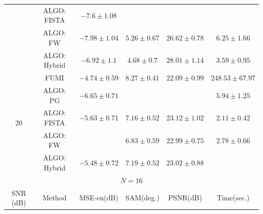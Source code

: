 \begin{table}[h]
{\begin{threeparttable}
\begin{tabular}{|c|c|c|c|c|c|}
                    & ALGO: FISTA            &                    {$-7.6\pm 1.08$}  & \cellcolor{red! 10}{$4.24\pm 0.79$} & \cellcolor{red! 10}{$28.84\pm 1.6$}  & \cellcolor{red! 10}{$3.02\pm 0.67$}     \tabularnewline
                    & ALGO: FW               &                    {$-7.98\pm 1.04$} &                    {$5.26\pm 0.67$} &                    {$26.62\pm 0.78$} &                    {$6.25\pm 1.66$}     \tabularnewline
                    & ALGO: Hybrid \tnote{1} &                    {$-6.92\pm 1.1$}  &                    {$4.68\pm 0.7$}  &                    {$28.01\pm 1.14$} &                    {$3.59\pm 0.95$}     \tabularnewline \hline \hline
\multirow{5}{*}{20} & FUMI                   &                    {$-4.74\pm 0.59$} &                    {$8.27\pm 0.41$} &                    {$22.09\pm 0.99$} &                    {$248.53\pm 67.97$}  \tabularnewline
                    & ALGO: PG               &                    {$-6.65\pm 0.71$} & \cellcolor{red! 10}{$6.56\pm 0.57$} & \cellcolor{red! 10}{$23.31\pm 0.85$} &                    {$5.94\pm 1.25$}     \tabularnewline
                    & ALGO: FISTA            &                    {$-5.63\pm 0.71$} &                    {$7.16\pm 0.52$} &                    {$23.12\pm 1.02$} &                    {$2.11\pm 0.42$}     \tabularnewline
                    & ALGO: FW               & \cellcolor{red! 10}{$-7\pm 0.79$}    &                    {$6.83\pm 0.59$} &                    {$22.99\pm 0.75$} &                    {$2.78\pm 0.66$}     \tabularnewline
                    & ALGO: Hybrid \tnote{1} &                    {$-5.48\pm 0.72$} &                    {$7.19\pm 0.52$} &                    {$23.02\pm 0.88$} & \cellcolor{red! 10}{$1.3\pm 0.43$}      \tabularnewline \hline \hline
\multicolumn{ 6}{|c|}{$N =16$} \tabularnewline \hline
SNR (dB)            & Method                 & MSE-en(dB)                           & SAM(deg.)                           & PSNR(dB)                             & Time(sec.)                              \tabularnewline \hline

\end{tabular}
\end{threeparttable}}
\end{table}
